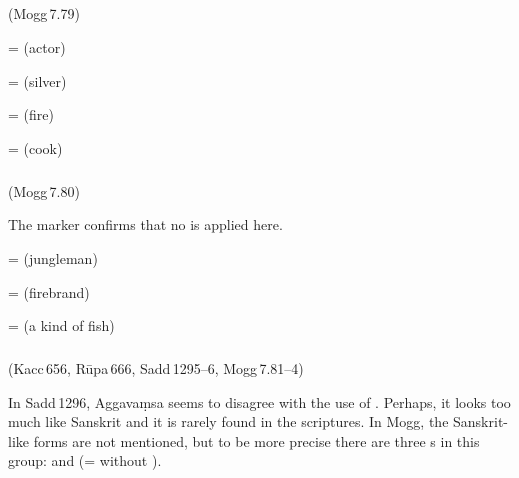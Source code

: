 \subparagraph*{} (Mogg\,7.79)\label{pacckx:ata}

 =  (actor)\par
{} =  (silver)\par
{} =  (fire)\par
{} =  (cook)\par

\subparagraph*{} (Mogg\,7.80)\label{pacckx:aataka}

The marker  confirms that no  is applied here.

 =  (jungleman)\par
{} =  (firebrand)\par
{} =  (a kind of fish)\par

\subparagraph*{} (Kacc\,656, R\=upa\,666, Sadd\,1295--6, Mogg\,7.81--4)\label{pacckx:ta}\label{pacckx:tradn}\label{pacckx:atta}\label{pacckx:taka}

In Sadd\,1296, Aggava\d msa seems to disagree with the use of . Perhaps, it looks too much like Sanskrit and it is rarely found in the scriptures. In Mogg, the Sanskrit-like forms are not mentioned, but to be more precise there are three s in this group:  and  (=  without ).

